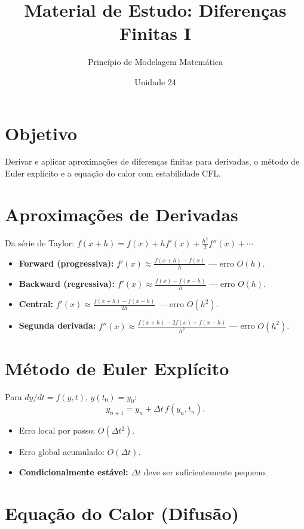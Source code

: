 \documentclass[12pt,a4paper]{article}
\title{Material de Estudo: Diferen\c{c}as Finitas I}
\author{Princ\'ipio de Modelagem Matem\'atica}
\date{Unidade 24}
\begin{document}
\maketitle

\section*{Objetivo}
Derivar e aplicar aproxima\c{c}\~oes de diferen\c{c}as finitas para derivadas, o m\'etodo de Euler expl\'icito e a equa\c{c}\~ao do calor com estabilidade CFL.

\section*{Aproxima\c{c}\~oes de Derivadas}

Da s\'erie de Taylor: $f(x+h) = f(x) + hf'(x) + \frac{h^2}{2}f''(x) + \cdots$

\begin{itemize}
  \item \textbf{Forward (progressiva):} $f'(x) \approx \frac{f(x+h)-f(x)}{h}$ --- erro $O(h)$.
  \item \textbf{Backward (regressiva):} $f'(x) \approx \frac{f(x)-f(x-h)}{h}$ --- erro $O(h)$.
  \item \textbf{Central:} $f'(x) \approx \frac{f(x+h)-f(x-h)}{2h}$ --- erro $O(h^2)$.
  \item \textbf{Segunda derivada:} $f''(x) \approx \frac{f(x+h)-2f(x)+f(x-h)}{h^2}$ --- erro $O(h^2)$.
\end{itemize}

\section*{M\'etodo de Euler Expl\'icito}

Para $dy/dt = f(y, t)$, $y(t_0) = y_0$:
\[
y_{n+1} = y_n + \Delta t\,f(y_n, t_n).
\]
\begin{itemize}
  \item Erro local por passo: $O(\Delta t^2)$.
  \item Erro global acumulado: $O(\Delta t)$.
  \item \textbf{Condicionalmente est\'avel:} $\Delta t$ deve ser suficientemente pequeno.
\end{itemize}

\section*{Equa\c{c}\~ao do Calor (Difus\~ao)}
\end{document}
